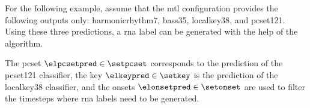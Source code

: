 
For the following example, assume that the \gls{mtl}
configuration provides the following outputs only:
\gls{harmonicrhythm7}, \gls{bass35},  \gls{localkey38}, and
\gls{pcset121}. Using these three predictions, a \gls{rna}
label can be generated with the help of the \algorithmrn{}
algorithm.

The \gls{pcset} $\elpcsetpred \in \setpcset$ corresponds to
the prediction of the \gls{pcset121} classifier, the key
$\elkeypred \in \setkey$ is the prediction of the
\gls{localkey38} classifier, and the onsets $\elonsetpred
\in \setonset$ are used to filter the timesteps where
\gls{rna} labels need to be generated.
